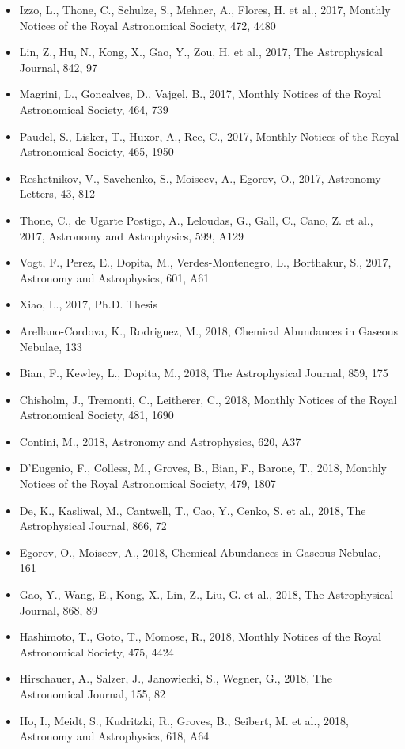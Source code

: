 \documentclass{letter}
\begin{document}
\begin{enumerate}
\begin{itemize}
\item Izzo, L., Thone, C., Schulze, S., Mehner, A., Flores, H. et al., 2017, Monthly Notices of the Royal Astronomical Society, 472, 4480
\item Lin, Z., Hu, N., Kong, X., Gao, Y., Zou, H. et al., 2017, The Astrophysical Journal, 842, 97
\item Magrini, L., Goncalves, D., Vajgel, B., 2017, Monthly Notices of the Royal Astronomical Society, 464, 739
\item Paudel, S., Lisker, T., Huxor, A., Ree, C., 2017, Monthly Notices of the Royal Astronomical Society, 465, 1950
\item Reshetnikov, V., Savchenko, S., Moiseev, A., Egorov, O., 2017, Astronomy Letters, 43, 812
\item Thone, C., de Ugarte Postigo, A., Leloudas, G., Gall, C., Cano, Z. et al., 2017, Astronomy and Astrophysics, 599, A129
\item Vogt, F., Perez, E., Dopita, M., Verdes-Montenegro, L., Borthakur, S., 2017, Astronomy and Astrophysics, 601, A61
\item Xiao, L., 2017, Ph.D. Thesis
\item Arellano-Cordova, K., Rodriguez, M., 2018, Chemical Abundances in Gaseous Nebulae, 133
\item Bian, F., Kewley, L., Dopita, M., 2018, The Astrophysical Journal, 859, 175
\item Chisholm, J., Tremonti, C., Leitherer, C., 2018, Monthly Notices of the Royal Astronomical Society, 481, 1690
\item Contini, M., 2018, Astronomy and Astrophysics, 620, A37
\item D'Eugenio, F., Colless, M., Groves, B., Bian, F., Barone, T., 2018, Monthly Notices of the Royal Astronomical Society, 479, 1807
\item De, K., Kasliwal, M., Cantwell, T., Cao, Y., Cenko, S. et al., 2018, The Astrophysical Journal, 866, 72
\item Egorov, O., Moiseev, A., 2018, Chemical Abundances in Gaseous Nebulae, 161
\item Gao, Y., Wang, E., Kong, X., Lin, Z., Liu, G. et al., 2018, The Astrophysical Journal, 868, 89
\item Hashimoto, T., Goto, T., Momose, R., 2018, Monthly Notices of the Royal Astronomical Society, 475, 4424
\item Hirschauer, A., Salzer, J., Janowiecki, S., Wegner, G., 2018, The Astronomical Journal, 155, 82
\item Ho, I., Meidt, S., Kudritzki, R., Groves, B., Seibert, M. et al., 2018, Astronomy and Astrophysics, 618, A64

\end{itemize}
\end{enumerate}
\end{document}
